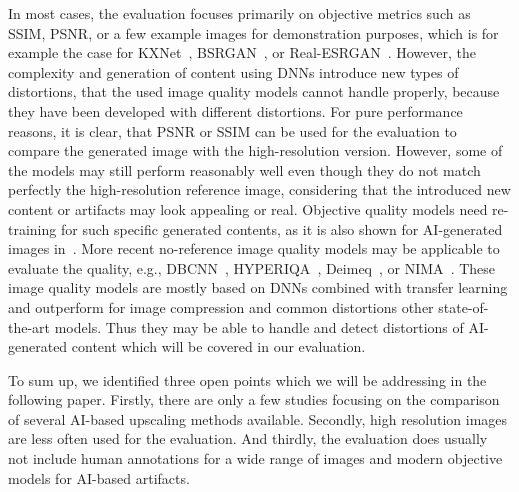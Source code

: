 In most cases, the evaluation focuses primarily on objective metrics such as SSIM, PSNR, or a few example images for demonstration purposes, which is for example the case for KXNet~\cite{fu2022kxnet}, BSRGAN~\cite{zhang2021designing}, or Real-ESRGAN~\cite{wang2021realesrgan}.
However, the complexity and generation of content using DNNs introduce new types of distortions, that the used image quality models cannot handle properly, because they have been developed with different distortions.
For pure performance reasons, it is clear, that PSNR or SSIM can be used for the evaluation to compare the generated image with the high-resolution version.
However, some of the models may still perform reasonably well even though they do not match perfectly the high-resolution reference image, considering that the introduced new content or artifacts may look appealing or real.
Objective quality models need re-training for such specific generated contents, as it is also shown for AI-generated images in~\cite{goering2023aiquality}.
More recent no-reference image quality models may be applicable to evaluate the quality, e.g., DBCNN~\cite{zhang2020blind}, HYPERIQA~\cite{su2020blindly}, Deimeq~\cite{goering2018Deimeq}, or NIMA~\cite{idealods2018imagequalityassessment}.
These image quality models are mostly based on DNNs combined with transfer learning and outperform for image compression and common distortions other state-of-the-art models.
Thus they may be able to handle and detect distortions of AI-generated content which will be covered in our evaluation.

To sum up, we identified three open points which we will be addressing in the following paper.
Firstly, there are only a few studies focusing on the comparison of several AI-based upscaling methods available.
Secondly, high resolution images are less often used for the evaluation.
And thirdly, the evaluation does usually not include human annotations for a wide range of images and modern objective models for AI-based artifacts.